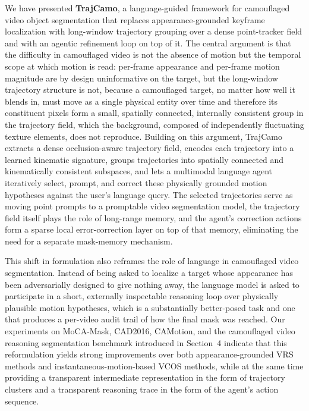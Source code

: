 \documentclass[11pt]{article}
\begin{document}
We have presented \textbf{TrajCamo}, a language-guided framework for camouflaged video object segmentation that replaces appearance-grounded keyframe localization with long-window trajectory grouping over a dense point-tracker field and with an agentic refinement loop on top of it.
The central argument is that the difficulty in camouflaged video is not the absence of motion but the temporal scope at which motion is read: per-frame appearance and per-frame motion magnitude are by design uninformative on the target, but the long-window trajectory structure is not, because a camouflaged target, no matter how well it blends in, must move as a single physical entity over time and therefore its constituent pixels form a small, spatially connected, internally consistent group in the trajectory field, which the background, composed of independently fluctuating texture elements, does not reproduce.
Building on this argument, TrajCamo extracts a dense occlusion-aware trajectory field, encodes each trajectory into a learned kinematic signature, groups trajectories into spatially connected and kinematically consistent subspaces, and lets a multimodal language agent iteratively select, prompt, and correct these physically grounded motion hypotheses against the user's language query.
The selected trajectories serve as moving point prompts to a promptable video segmentation model, the trajectory field itself plays the role of long-range memory, and the agent's correction actions form a sparse local error-correction layer on top of that memory, eliminating the need for a separate mask-memory mechanism.

This shift in formulation also reframes the role of language in camouflaged video segmentation.
Instead of being asked to localize a target whose appearance has been adversarially designed to give nothing away, the language model is asked to participate in a short, externally inspectable reasoning loop over physically plausible motion hypotheses, which is a substantially better-posed task and one that produces a per-video audit trail of how the final mask was reached.
Our experiments on MoCA-Mask, CAD2016, CAMotion, and the camouflaged video reasoning segmentation benchmark introduced in Section~4 indicate that this reformulation yields strong improvements over both appearance-grounded VRS methods and instantaneous-motion-based VCOS methods, while at the same time providing a transparent intermediate representation in the form of trajectory clusters and a transparent reasoning trace in the form of the agent's action sequence.
\end{document}
